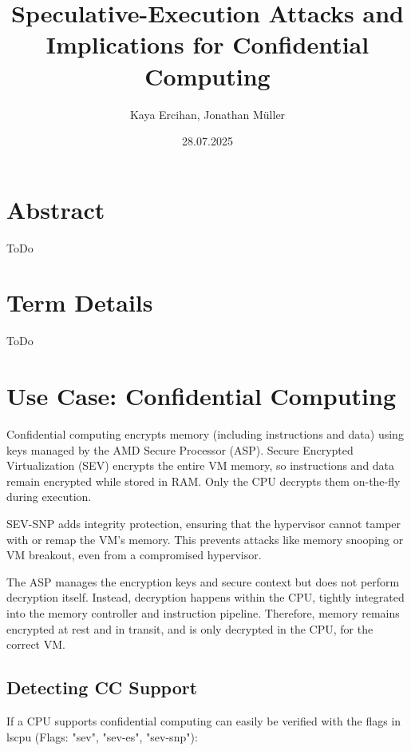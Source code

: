 \documentclass[11pt,a4paper]{article}
\title{Speculative-Execution Attacks and Implications for Confidential Computing}
\author{Kaya Ercihan, Jonathan Müller}
\date{28.07.2025}
\begin{document}
\maketitle

\section*{Abstract}
ToDo

\section{Term Details}
ToDo

\section{Use Case: Confidential Computing}
Confidential computing encrypts memory (including instructions and data) using keys managed by the AMD Secure Processor (ASP). Secure Encrypted Virtualization (SEV) encrypts the entire VM memory, so instructions and data remain encrypted while stored in RAM. Only the CPU decrypts them on-the-fly during execution.

SEV-SNP adds integrity protection, ensuring that the hypervisor cannot tamper with or remap the VM's memory. This prevents attacks like memory snooping or VM breakout, even from a compromised hypervisor.

The ASP manages the encryption keys and secure context but does not perform decryption itself. Instead, decryption happens within the CPU, tightly integrated into the memory controller and instruction pipeline. Therefore, memory remains encrypted at rest and in transit, and is only decrypted in the CPU, for the correct VM.
\clearpage

\subsection{Detecting CC Support}
If a CPU supports confidential computing can easily be verified with the flags in lscpu (Flags: "sev", "sev-es", "sev-snp"):
\end{document}
